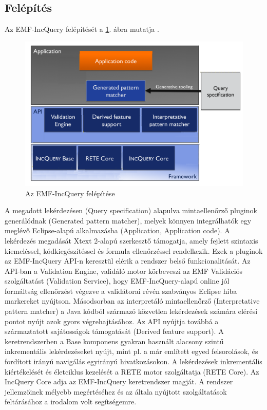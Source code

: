 \subsection{Felépítés}

Az EMF-IncQuery felépítését a \ref{fig:EMFIncQueryStructure}. ábra mutatja \cite{Bergmann-TOOLS-2012}.
%
\begin{figure}[htb]
\centering
\includegraphics[width=\textwidth]{figures/emf-incquery-structure.png}
\caption{Az EMF-IncQuery felépítése}
\label{fig:EMFIncQueryStructure}
\end{figure}
%
A megadott lekérdezésen (Query specification) alapulva mintaellenőrző pluginok generálódnak (Generated pattern matcher), melyek könnyen integrálhatók egy meglévő Eclipse-alapú alkalmazásba (Application, Application code).
A lekérdezés megadását Xtext 2-alapú szerkesztő támogatja, amely fejlett szintaxis kiemeléssel, kódkiegészítéssel és formula ellenőrzéssel rendelkezik.
Ezek a pluginok az EMF-IncQuery API-n keresztül elérik a rendszer belső funkcionalitását.
Az API-ban a Validation Engine, validáló motor körbeveszi az \gls{EMF} Validációs szolgáltatást  (Validation Service), hogy EMF-IncQuery-alapú online jól formáltság ellenőrzést végezve a validátorai révén szabványos Eclipse hiba markereket nyújtson.
Másodsorban az interpretáló mintaellenőrző (Interpretative pattern matcher) a Java kódból származó közvetlen lekérdezések számára elérési pontot nyújt azok gyors végrehajtásához.
Az API nyújtja továbbá a származtatott sajátosságok támogatását (Derived feature support).
A keretrendszerben a Base komponens gyakran használt alacsony szintű inkrementális lekérdezéseket nyújt, mint pl. a már említett egyed felsorolások, és fordított irányú navigálás egyirányú hivatkozásokon.
A lekérdezések inkrementális kiértékelését és életciklus kezelését a RETE motor szolgáltatja (RETE Core).
Az IncQuery Core adja az EMF-IncQuery keretrendszer magját.
A rendszer jellemzőinek mélyebb megértéséhez és az általa nyújtott szolgáltatások feltárásához a \cite{Bergmann-TOOLS-2012} irodalom volt segítségemre.

